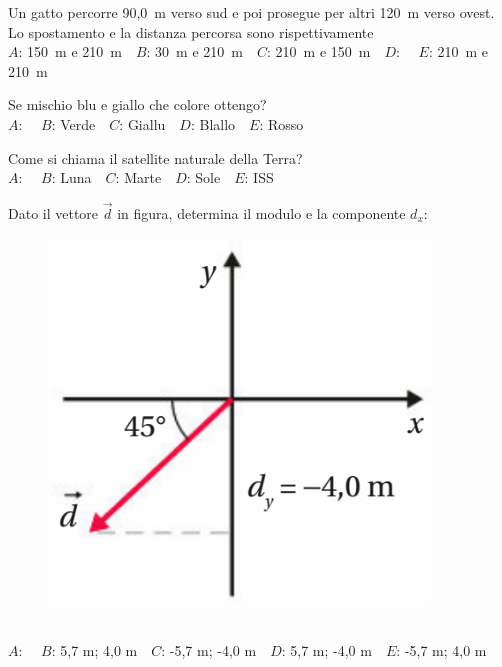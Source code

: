 \def\mcquestionnumber{4}


\mcquestionheader Un gatto percorre 90,0~m verso sud e poi prosegue per altri 120~m verso ovest. Lo spostamento e la distanza percorsa sono rispettivamente\\
{$A$}: 150~m e 210~m\ \ {$B$}: 30~m e 210~m\ \ {$C$}: 210~m e 150~m\ \ {$D$}: \ \ {$E$}: 210~m e 210~m\ \ 

\mcquestionfooter



\def\mcquestionnumber{5}


\mcquestionheader Se mischio blu e giallo che colore ottengo?\\
{$A$}: \ \ {$B$}: Verde\ \ {$C$}: Giallu\ \ {$D$}: Blallo\ \ {$E$}: Rosso\ \ 

\mcquestionfooter



\def\mcquestionnumber{6}


\mcquestionheader Come si chiama il satellite naturale della Terra?\\
{$A$}: \ \ {$B$}: Luna\ \ {$C$}: Marte\ \ {$D$}: Sole\ \ {$E$}: ISS\ \ 

\mcquestionfooter



\def\mcquestionnumber{7}


\mcquestionheader Dato il vettore $\vec{d}$ in figura, determina il modulo e la componente $d_x$: \begin{figure}[h!]   \begin{center}     \includegraphics[scale=0.35]{vettored.png}   \end{center} \end{figure}\\
{$A$}: \ \ {$B$}: 5,7 m; 4,0 m\ \ {$C$}: -5,7 m; -4,0 m\ \ {$D$}: 5,7 m; -4,0 m\ \ {$E$}: -5,7 m; 4,0 m\ \ 

